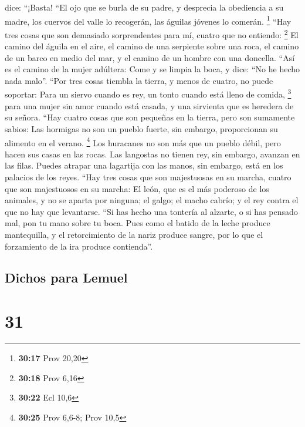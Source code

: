 dice: ``¡Basta!  ``El ojo que se burla de su padre, y
desprecia la obediencia a su madre, los cuervos del valle lo recogerán,
las águilas jóvenes lo comerán. \footnote{\textbf{30:17} Prov 20,20}
 ``Hay tres cosas que son demasiado sorprendentes para
mí, cuatro que no entiendo: \footnote{\textbf{30:18} Prov 6,16}
 El camino del águila en el aire, el camino de una
serpiente sobre una roca, el camino de un barco en medio del mar, y el
camino de un hombre con una doncella.  ``Así es el camino
de la mujer adúltera: Come y se limpia la boca, y dice: ``No he hecho
nada malo''.  ``Por tres cosas tiembla la tierra, y menos
de cuatro, no puede soportar:  Para un siervo cuando es
rey, un tonto cuando está lleno de comida, \footnote{\textbf{30:22} Ecl
  10,6}  para una mujer sin amor cuando está casada, y
una sirvienta que es heredera de su señora.  ``Hay cuatro
cosas que son pequeñas en la tierra, pero son sumamente sabios:
 Las hormigas no son un pueblo fuerte, sin embargo,
proporcionan su alimento en el verano. \footnote{\textbf{30:25} Prov
  6,6-8; Prov 10,5}  Los huracanes no son más que un
pueblo débil, pero hacen sus casas en las rocas.  Las
langostas no tienen rey, sin embargo, avanzan en las filas.
 Puedes atrapar una lagartija con las manos, sin embargo,
está en los palacios de los reyes.  ``Hay tres cosas que
son majestuosas en su marcha, cuatro que son majestuosos en su marcha:
 El león, que es el más poderoso de los animales, y no se
aparta por ninguna;  el galgo; el macho cabrío; y el rey
contra el que no hay que levantarse.  ``Si has hecho una
tontería al alzarte, o si has pensado mal, pon tu mano sobre tu boca.
 Pues como el batido de la leche produce mantequilla, y
el retorcimiento de la nariz produce sangre, por lo que el forzamiento
de la ira produce contienda''.

\hypertarget{dichos-para-lemuel}{%
\subsection{Dichos para Lemuel}\label{dichos-para-lemuel}}

\hypertarget{section-30}{%
\section{31}\label{section-30}}

